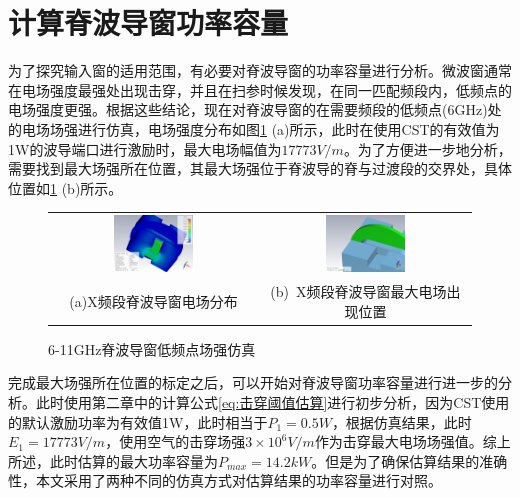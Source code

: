 \documentclass[master]{thesis-uestc}
\begin{document}
\section{计算脊波导窗功率容量}
为了探究输入窗的适用范围，有必要对脊波导窗的功率容量进行分析。微波窗通常在电场强度最强处出现击穿，并且在扫参时候发现，在同一匹配频段内，低频点的电场强度更强。根据这些结论，现在对脊波导窗的在需要频段的低频点(6GHz)处的电场场强进行仿真，电场强度分布如图\ref{fig:X频段脊波导窗低频点场强仿真} (a)所示，此时在使用CST的有效值为1W的波导端口进行激励时，最大电场幅值为\(17773V/m\)。为了方便进一步地分析，需要找到最大场强所在位置，其最大场强位于脊波导的脊与过渡段的交界处，具体位置如\ref{fig:X频段脊波导窗低频点场强仿真} (b)所示。
\begin{figure}[!htb]
    \small
    \centering
    \begin{tabular}{@{\ }c@{\ }c}
        \includegraphics[width=0.4\textwidth]{pic/chapter3/X频段等效1W最大场强.png} & 
        \hspace{5pt}
        \includegraphics[width=0.4\textwidth]{pic/chapter3/X频段最大场强出现位置.png}     \\
        \mbox{\small (a)X频段脊波导窗电场分布}                                                                               & 
        \mbox{\small (b) X频段脊波导窗最大电场出现位置}                                                                                  \\
    \end{tabular}
    \caption{6-11GHz脊波导窗低频点场强仿真}
    \label{fig:X频段脊波导窗低频点场强仿真}
\end{figure}

完成最大场强所在位置的标定之后，可以开始对脊波导窗功率容量进行进一步的分析。此时使用第二章中的计算公式\ref{eq:击穿阈值估算}进行初步分析，因为CST使用的默认激励功率为有效值1W，此时相当于\(P_{1}=0.5W\)，根据仿真结果，此时\(E_1 = 17773V/m\)，使用空气的击穿场强\(3 \times 10^6V/m\)作为击穿最大电场场强值。综上所述，此时估算的最大功率容量为\(P_{max}=14.2kW\)。但是为了确保估算结果的准确性，本文采用了两种不同的仿真方式对估算结果的功率容量进行对照。
\end{document}
